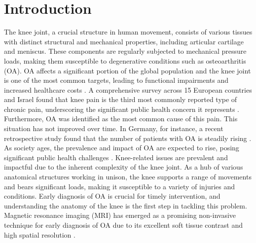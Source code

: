 \documentclass{micro-econ-thesis}
\begin{document}

\cleardoublepage
\pagestyle{headings}
\setcounter{page}{1}
\onehalfspacing %

\section{Introduction}

The knee joint, a crucial structure in human movement, consists of various tissues with distinct structural and mechanical properties, including articular cartilage and meniscus. These components are regularly subjected to mechanical pressure loads, making them susceptible to degenerative conditions such as osteoarthritis (OA). OA affects a significant portion of the global population and the knee joint is one of the most common targets, leading to functional impairments and increased healthcare costs \parencite{WHO}. A comprehensive survey across 15 European countries and Israel found that knee pain is the third most commonly reported type of chronic pain, underscoring the significant public health concern it represents \parencite{breivik_survey_2006}. Furthermore, OA was identified as the most common cause of this pain. This situation has not improved over time. In Germany, for instance, a recent retrospective study found that the number of patients with OA is steadily rising \parencite{obermuller_epidemiology_2024}. As society ages, the prevalence and impact of OA are expected to rise, posing significant public health challenges \parencite{yelin_burden_2016}. Knee-related issues are prevalent and impactful due to the inherent complexity of the knee joint. As a hub of various anatomical structures working in unison, the knee supports a range of movements and bears significant loads, making it susceptible to a variety of injuries and conditions. Early diagnosis of OA is crucial for timely intervention, and understanding the anatomy of the knee is the first step in tackling this problem. Magnetic resonance imaging (MRI) has emerged as a promising non-invasive technique for early diagnosis of OA due to its excellent soft tissue contrast and high spatial resolution \parencite{kijowski_osteoarthritis_2020}. 
\end{document}
